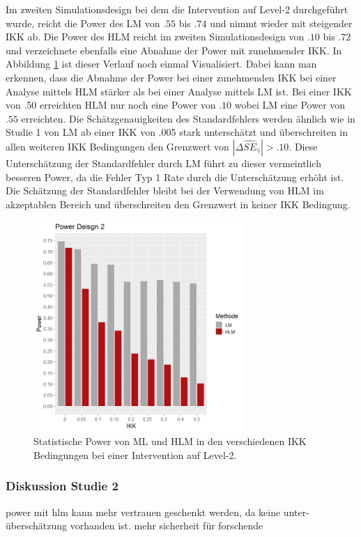 \documentclass[12pt]{article}\usepackage[]{graphicx}\usepackage[]{color}
\begin{document}
Im zweiten Simulationsdesign bei dem die Intervention auf Level-2 durchgeführt wurde, reicht die Power des LM von $.55$ bis $.74$ und nimmt wieder mit steigender IKK ab. Die Power des HLM reicht im zweiten Simulationsdesign von $.10$ bis $.72$ und verzeichnete ebenfalls eine Abnahme der Power mit zunehmender IKK. In Abbildung \ref{fig:power_design2} ist dieser Verlauf noch einmal Visualisiert. Dabei kann man erkennen, dass die Abnahme der Power bei einer zunehmenden IKK bei einer Analyse mittels HLM stärker als bei einer Analyse mittels LM ist. Bei einer IKK von .50 erreichten HLM nur noch eine Power von $.10$ wobei LM eine Power von $.55$ erreichten. Die Schätzgenauigkeiten des Standardfehlers werden ähnlich wie in Studie 1 von LM ab einer IKK von .005 stark unterschätzt und überschreiten in allen weiteren IKK Bedingungen den Grenzwert von $|\Delta\widehat{SE}_{\widehat{\gamma}}| > .10$. Diese Unterschätzung der Standardfehler durch LM führt zu dieser vermeintlich besseren Power, da die Fehler Typ 1 Rate durch die Unterschätzung erhöht ist. Die Schätzung der Standardfehler bleibt bei der Verwendung von HLM im akzeptablen Bereich und überschreiten den Grenzwert in keiner IKK Bedingung. 
\begin{figure}[t!]
\centering
\captionsetup{width=8cm}
\includegraphics[width=8cm, height=8cm]{power_design2}
\caption{Statistische Power von ML und HLM in den verschiedenen IKK Bedingungen bei einer Intervention auf Level-2.}
\label{fig:power_design2}
\end{figure}

\subsubsection{Diskussion Studie 2}
power mit hlm kann mehr vertrauen geschenkt werden, da keine unter-überschätzung vorhanden ist. mehr sicherheit für forschende
\end{document}

